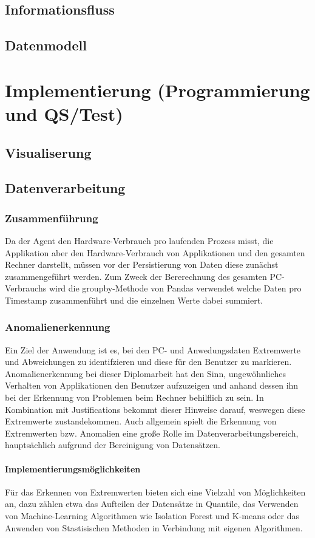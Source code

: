 \documentclass{report}
\begin{document}
\section{Informationsfluss}
\section{Datenmodell}

\chapter{Implementierung (Programmierung und QS/Test)}
\section{Visualiserung}
\section{Datenverarbeitung}
\subsection{Zusammenführung}
Da der Agent den Hardware-Verbrauch pro laufenden Prozess misst, die Applikation aber den Hardware-Verbrauch von Applikationen und den gesamten Rechner darstellt, müssen vor der Persistierung von Daten diese zunächst zusammengeführt werden. Zum Zweck der Bererechnung des gesamten PC-Verbrauchs wird die groupby-Methode von Pandas verwendet welche Daten pro Timestamp zusammenführt und die einzelnen Werte dabei summiert.
\subsection{Anomalienerkennung}
Ein Ziel der Anwendung ist es, bei den PC- und Anwedungsdaten Extremwerte und Abweichungen zu identifzieren und diese für den Benutzer zu markieren. Anomalienerkennung bei dieser Diplomarbeit hat den Sinn, ungewöhnliches Verhalten von Applikationen den Benutzer aufzuzeigen und anhand dessen ihn bei der Erkennung von Problemen beim Rechner behilflich zu sein. In Kombination mit Justifications bekommt dieser Hinweise darauf, weswegen diese Extremwerte zustandekommen. Auch allgemein spielt die Erkennung von Extremwerten bzw. Anomalien eine große Rolle im Datenverarbeitungsbereich, hauptsächlich aufgrund der Bereinigung von Datensätzen.
\subsubsection{Implementierungsmöglichkeiten}
Für das Erkennen von Extremwerten bieten sich eine Vielzahl von Möglichkeiten an, dazu zählen etwa das Aufteilen der Datensätze in Quantile, das Verwenden von Machine-Learning Algorithmen wie Isolation Forest und K-means oder das Anwenden von Stastisischen Methoden in Verbindung mit eigenen Algorithmen. 
\end{document}
